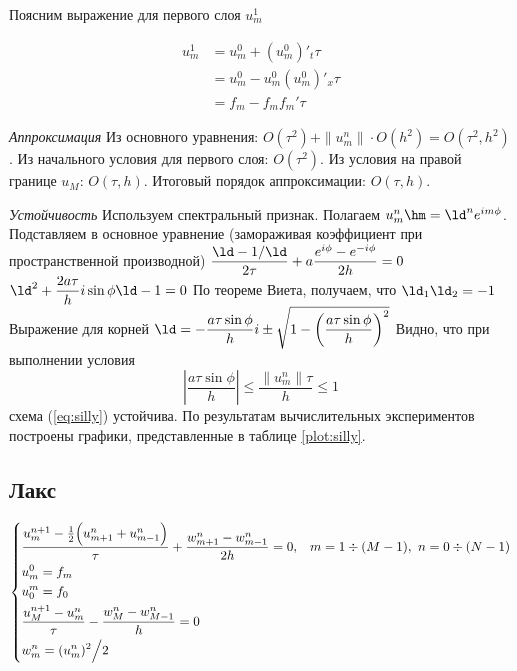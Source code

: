 \documentclass[a4paper,12pt]{article}
\begin{document}
  \jp
  Поясним выражение для первого слоя $u_m^1$
  
  \begin{equation*}
  \begin{split}
    u_m^1 &= u_m^0 + (u_m^0)'_t \tau\\
      &= u_m^0 - u_m^0(u_m^0)'_x \tau\\
      &= f_m - f_m f_m' \tau
  \end{split}
  \end{equation*}
  
  \jp
  \emph{Аппроксимация}
  \jp
  Из основного уравнения: $O(\tau^2) + \|u_m^n\| \cdot O(h^2) = O(\tau^2, h^2)$.\sp
  Из начального условия для первого слоя: $O(\tau^2)$.\sp
  Из условия на правой границе $u_M$: $O(\tau, h)$.\sp
  Итоговый порядок аппроксимации: $O(\tau, h)$.
  
  \jp
  \emph{Устойчивость}
  \jp
  Используем спектральный признак.
  Полагаем $u_m^n \hm= \ld^n e^{im\phi}$.
  Подставляем в основное уравнение (замораживая коэффициент при пространственной производной)\jp
  $\dfrac{\ld - 1/\ld}{2\tau} + a \dfrac{e^{i\phi} - e^{-i\phi}}{2h} = 0$\sp
  $\ld^2 + \dfrac{2a\tau}{h}i\sin{\phi} \ld - 1 = 0$\jp
  По теореме Виета, получаем, что\jp
  $\ld_1 \ld_2 = -1$\jp
  Выражение для корней\jp
  $\ld = -\dfrac{a\tau\sin{\phi}}{h} i \pm \sqrt{1 - \left(\dfrac{a\tau\sin{\phi}}{h}\right)^2}$\jp
  Видно, что при выполнении условия
  \[
    \left|\frac{a\tau\sin{\phi}}{h}\right| \leq \frac{\|u_m^n\| \tau}{h} \leq 1
  \]
  схема (\ref{eq:silly}) устойчива.
  \jp
  По результатам вычислительных экспериментов построены графики, представленные в таблице \ref{plot:silly}.
  \newpage
  
\subsection{Лакс}
\label{sec:lax}
  \begin{equation}
    \left\{
    \begin{aligned}
      &\frac{u_m^{n+1} - \frac{1}{2} \Bigl(u_{m+1}^n + u_{m-1}^n\Bigr)}{\tau} + \frac{w_{m+1}^n - w_{m-1}^n}{2h} = 0, & &m = 1 \div (M-1),\ n = 0 \div (N-1)\\
      &u_m^0 = f_m & &{}\\
      &u_0^m = f_0 & &{}\\
      &\frac{u_M^{n+1} - u_m^n}{\tau} - \frac{w_M^n - w_{M-1}^n}{h} = 0 & &{}\\
      &w_m^n = (u_m^n)^2 \Big/ 2 & &{}
    \end{aligned}
    \right.
    \label{eq:lax}
  \end{equation}
  
\end{document}

